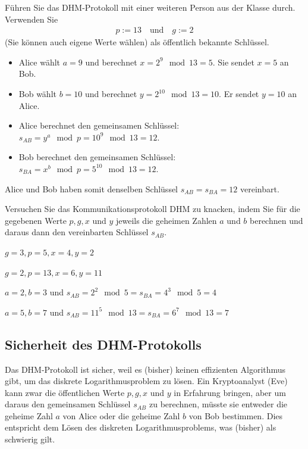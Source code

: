 \begin{myexercise}
	Führen Sie das \gls{DHM}-Protokoll mit einer weiteren Person aus der Klasse durch. Verwenden Sie
	\begin{align*}
		p := 13 \quad \text{und}\quad g := 2
	\end{align*}
	(Sie können auch eigene Werte wählen) als öffentlich bekannte Schlüssel.
	\begin{myanswer}
		\begin{itemize}
		\item Alice wählt $a = 9$ und berechnet $x = 2^9 \mod 13 = 5$. Sie sendet $x = 5$ an Bob.
		\item Bob wählt $b = 10$ und berechnet $y = 2^{10} \mod 13 = 10$. Er sendet $y = 10$ an Alice.
		\item Alice berechnet den gemeinsamen Schlüssel: $s_{AB} = y^a \mod p = 10^9 \mod 13 = 12$.
		\item Bob berechnet den gemeinsamen Schlüssel: $s_{BA} = x^b \mod p = 5^{10} \mod 13 = 12$.
		\end{itemize}
		Alice und Bob haben somit denselben Schlüssel $s_{AB} = s_{BA} = 12$ vereinbart.
	\end{myanswer}
\end{myexercise}

\begin{myexercise}
	Versuchen Sie das Kommunikationsprotokoll \gls{DHM} zu knacken, indem Sie
	für die gegebenen Werte $p, g, x$ und $y$ jeweils die geheimen Zahlen $a$ und $b$ berechnen und daraus
	dann den vereinbarten Schlüssel $s_{AB}$.
	\begin{aenum}
		\item $g = 3, p = 5, x = 4, y = 2$
		\item $g = 2, p = 13, x = 6, y = 11$
	\end{aenum}
	\begin{myanswer}
		\begin{aenum}
			\item $a = 2, b = 3$ und $s_{AB} = 2^{2}\mod 5 = s_{BA} = 4^3 \mod 5 = 4$
			\item $a = 5, b = 7$ und $s_{AB} = 11^5 \mod 13 = s_{BA} = 6^7 \mod 13 = 7$
		\end{aenum}
	\end{myanswer}
\end{myexercise}

\subsection{Sicherheit des \gls{DHM}-Protokolls}
Das \gls{DHM}-Protokoll ist sicher, weil es (bisher) keinen effizienten Algorithmus gibt, um das diskrete Logarithmusproblem zu lösen. Ein Kryptoanalyst (Eve) kann zwar die öffentlichen Werte $p, g, x$ und $y$ in Erfahrung bringen, aber um daraus den gemeinsamen Schlüssel $s_{AB}$ zu berechnen, müsste sie entweder die geheime Zahl $a$ von Alice oder die geheime Zahl $b$ von Bob bestimmen. Dies entspricht dem Lösen des diskreten Logarithmusproblems, was (bisher) als schwierig gilt.

